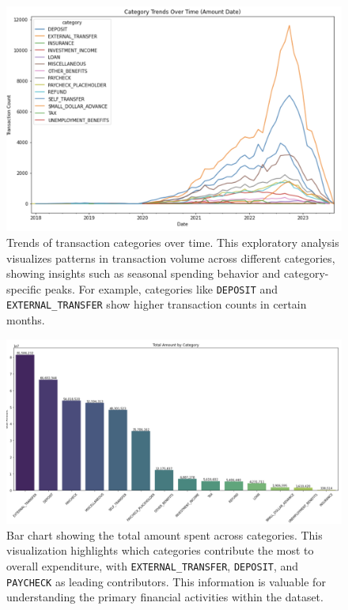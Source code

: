 \documentclass[12pt,letterpaper]{article}
\begin{document}
\begin{figure}[H]
    \centering
    \includegraphics[width=\textwidth]{figure/category_time.png}
    \caption{Trends of transaction categories over time. This exploratory analysis visualizes patterns in transaction volume across different categories, showing insights such as seasonal spending behavior and category-specific peaks. For example, categories like \texttt{DEPOSIT} and \texttt{EXTERNAL\_TRANSFER} show higher transaction counts in certain months.}
    \label{fig:category_trends}
\end{figure}

\begin{figure}[H]
    \centering
    \includegraphics[width=\textwidth]{figure/amt_category.png}
    \caption{Bar chart showing the total amount spent across categories. This visualization highlights which categories contribute the most to overall expenditure, with \texttt{EXTERNAL\_TRANSFER}, \texttt{DEPOSIT}, and \texttt{PAYCHECK} as leading contributors. This information is valuable for understanding the primary financial activities within the dataset.}
    \label{fig:total_amount_by_category}
\end{figure}
\end{document}
